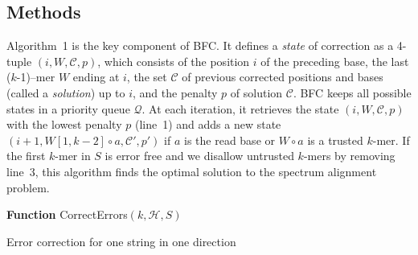 \documentclass{bioinfo}
\begin{document}
\begin{methods}
\section{Methods}
Algorithm~1 is the key component of BFC. It defines a \emph{state}
of correction as a 4-tuple $(i,W,\mathcal{C},p)$, which consists of the
position $i$ of the preceding base, the last \mbox{($k$-1)--mer} $W$ ending at
$i$, the set $\mathcal{C}$ of previous corrected positions and bases (called a
\emph{solution}) up to $i$, and the penalty $p$ of solution $\mathcal{C}$. BFC
keeps all possible states in a priority queue $\mathcal{Q}$. At each iteration,
it retrieves the state $(i,W,\mathcal{C},p)$ with the lowest penalty $p$ (line~1) and
adds a new state $(i+1,W[1,k-2]\circ a,\mathcal{C}',p')$ if $a$ is the read
base or $W\circ a$ is a trusted $k$-mer. If the first $k$-mer in $S$ is
error free and we disallow untrusted $k$-mers by removing line~3, this
algorithm finds the optimal solution to the spectrum alignment problem.

\begin{algorithm}[ht]
\DontPrintSemicolon
\footnotesize
{}
\BlankLine
\textbf{Function} {\sc CorrectErrors}$(k, \mathcal{H}, S)$
\caption{Error correction for one string in one direction}
\end{algorithm}


\end{methods}
\end{document}
